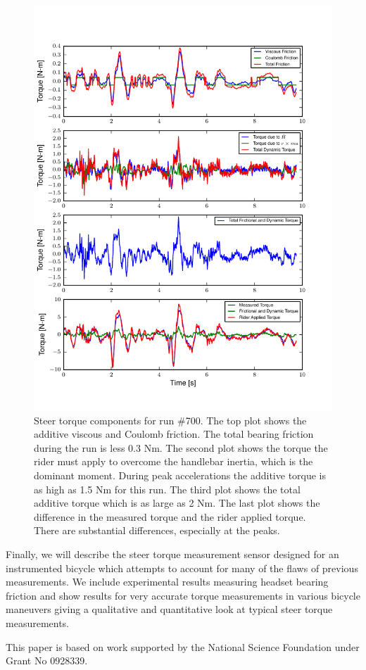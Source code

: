 \documentclass{article}
\begin{document}
\begin{figure}
  \centering
  \includegraphics[width=5.0in]{steer-torque-components.pdf}
  \caption{Steer torque components for run \#700. The top plot shows the
  additive viscous and Coulomb friction. The total bearing friction during the
  run is less 0.3 Nm. The second plot shows the torque the rider must apply to
  overcome the handlebar inertia, which is the dominant moment. During peak
  accelerations the additive torque is as high as 1.5 Nm for this run. The
  third plot shows the total additive torque which is as large as 2 Nm. The
  last plot shows the difference in the measured torque and the rider applied
  torque. There are substantial differences, especially at the peaks.}
\end{figure}

Finally, we will describe the steer torque measurement sensor designed for an
instrumented bicycle which attempts to account for many of the flaws of
previous measurements. We include experimental results measuring headset
bearing friction and show results for very accurate torque measurements in
various bicycle maneuvers giving a qualitative and quantitative look at typical
steer torque measurements.

This paper is based on work supported by the National Science Foundation under
Grant No 0928339.



\end{document}
